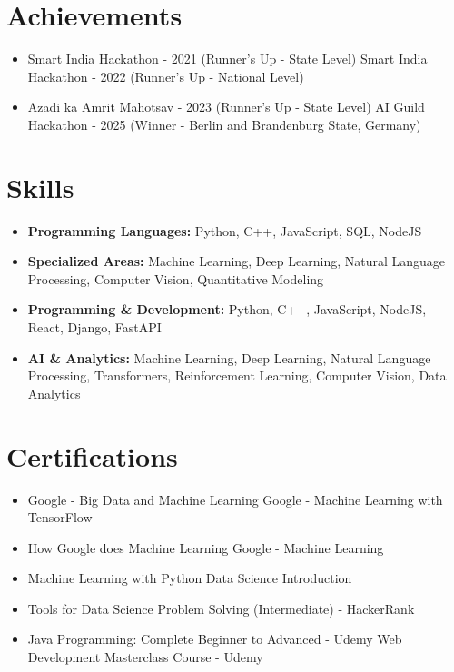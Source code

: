 \documentclass[a4paper,10pt]{article}
\begin{document}
\section*{Achievements}
\begin{itemize}
\item Smart India Hackathon - 2021 (Runner's Up - State Level) \hfill Smart India Hackathon - 2022 (Runner's Up - National Level)
\item Azadi ka Amrit Mahotsav - 2023 (Runner's Up - State Level) \hfill AI Guild Hackathon - 2025 (Winner - Berlin and Brandenburg State, Germany)
\end{itemize}

\section*{Skills}
\begin{itemize}
  \item \textbf{Programming Languages:} Python, C++, JavaScript, SQL, NodeJS
  \item \textbf{Specialized Areas:} Machine Learning, Deep Learning, Natural Language Processing, Computer Vision, Quantitative Modeling
  \item \textbf{Programming \& Development:} Python, C++, JavaScript, NodeJS, React, Django, FastAPI
  \item \textbf{AI \& Analytics:} Machine Learning, Deep Learning, Natural Language Processing, Transformers, Reinforcement Learning, Computer Vision, Data Analytics
\end{itemize}

\section*{Certifications}
\begin{itemize}
\item Google - Big Data and Machine Learning \hfill Google - Machine Learning with TensorFlow
\item How Google does Machine Learning \hfill Google - Machine Learning
\item Machine Learning with Python \hfill Data Science Introduction
\item Tools for Data Science \hfill Problem Solving (Intermediate) - HackerRank
\item Java Programming: Complete Beginner to Advanced - Udemy \hfill Web Development Masterclass Course - Udemy
\end{itemize}
\end{document}
